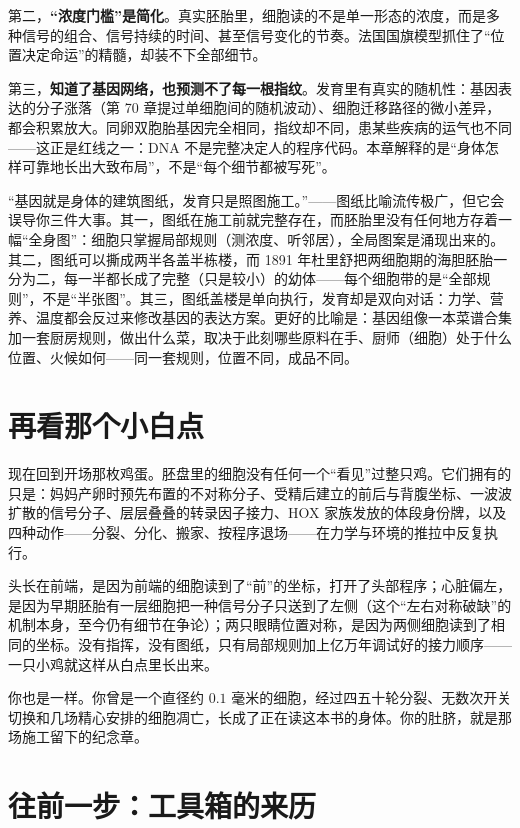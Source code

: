 第二，\textbf{“浓度门槛”是简化}。真实胚胎里，细胞读的不是单一形态的浓度，而是多种信号的组合、信号持续的时间、甚至信号变化的节奏。法国国旗模型抓住了“位置决定命运”的精髓，却装不下全部细节。

第三，\textbf{知道了基因网络，也预测不了每一根指纹}。发育里有真实的随机性：基因表达的分子涨落（第 70 章提过单细胞间的随机波动）、细胞迁移路径的微小差异，都会积累放大。同卵双胞胎基因完全相同，指纹却不同，患某些疾病的运气也不同——这正是红线之一：DNA 不是完整决定人的程序代码。本章解释的是“身体怎样可靠地长出大致布局”，不是“每个细节都被写死”。

\begin{wuqu}
“基因就是身体的建筑图纸，发育只是照图施工。”——图纸比喻流传极广，但它会误导你三件大事。其一，图纸在施工前就完整存在，而胚胎里没有任何地方存着一幅“全身图”：细胞只掌握局部规则（测浓度、听邻居），全局图案是涌现出来的。其二，图纸可以撕成两半各盖半栋楼，而 1891 年杜里舒把两细胞期的海胆胚胎一分为二，每一半都长成了完整（只是较小）的幼体——每个细胞带的是“全部规则”，不是“半张图”。其三，图纸盖楼是单向执行，发育却是双向对话：力学、营养、温度都会反过来修改基因的表达方案。更好的比喻是：基因组像一本菜谱合集加一套厨房规则，做出什么菜，取决于此刻哪些原料在手、厨师（细胞）处于什么位置、火候如何——同一套规则，位置不同，成品不同。
\end{wuqu}

\section{再看那个小白点}

现在回到开场那枚鸡蛋。胚盘里的细胞没有任何一个“看见”过整只鸡。它们拥有的只是：妈妈产卵时预先布置的不对称分子、受精后建立的前后与背腹坐标、一波波扩散的信号分子、层层叠叠的转录因子接力、HOX 家族发放的体段身份牌，以及四种动作——分裂、分化、搬家、按程序退场——在力学与环境的推拉中反复执行。

头长在前端，是因为前端的细胞读到了“前”的坐标，打开了头部程序；心脏偏左，是因为早期胚胎有一层细胞把一种信号分子只送到了左侧（这个“左右对称破缺”的机制本身，至今仍有细节在争论）；两只眼睛位置对称，是因为两侧细胞读到了相同的坐标。没有指挥，没有图纸，只有局部规则加上亿万年调试好的接力顺序——一只小鸡就这样从白点里长出来。

你也是一样。你曾是一个直径约 $0.1$ 毫米的细胞，经过四五十轮分裂、无数次开关切换和几场精心安排的细胞凋亡，长成了正在读这本书的身体。你的肚脐，就是那场施工留下的纪念章。

\section{往前一步：工具箱的来历}

